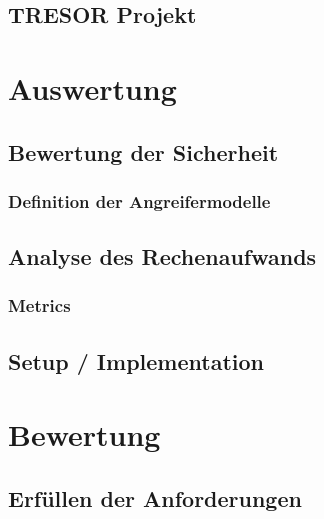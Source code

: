 \documentclass[11pt,a4paper]{scrreprt}
\begin{document}
\section{TRESOR Projekt}


\chapter{Auswertung}
\section{Bewertung der Sicherheit}
\subsection{Definition der Angreifermodelle}

\section{Analyse des Rechenaufwands}
\subsection{Metrics}


\section{Setup / Implementation}




\chapter{Bewertung}
\section{Erfüllen der Anforderungen}
\end{document}
